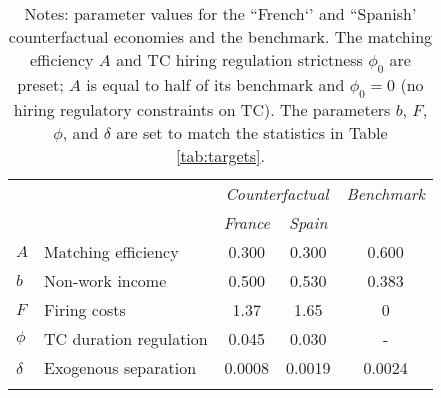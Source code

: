 \begin{table}[!h]
	\centering
	\label{tab:param:counterfactual}
	\begin{tabular}{l l c c c}
		\hline \hline
		  & & \multicolumn{2}{c}{\textit{Counterfactual}} & \textit{Benchmark} \\ 
		& & \textit{France} & \textit{Spain} \\ 
		\addlinespace
		\addlinespace
		$A$ & Matching efficiency    \hspace{80pt} & 0.300 & 0.300 & 0.600 \\ 
		$b$ & Non-work income & 0.500 & 0.530 & 0.383 \\ 
		$F$ & Firing costs & 1.37 & 1.65 & 0 \\ 
		$\phi$ & TC duration regulation & 0.045 & 0.030 & - \\ 
		$\delta$ & Exogenous separation & 0.0008 & 0.0019 & 0.0024 \\ 
		\addlinespace
		\hline \hline
	\end{tabular}
\caption*{\footnotesize Notes: parameter values for the ``French`' and ``Spanish' counterfactual economies and the benchmark. The matching efficiency $A$ and TC hiring regulation strictness $\phi_0$ are preset; $A$ is equal to half of its benchmark and $\phi_0=0$ (no hiring regulatory constraints on TC). The parameters $b$, $F$, $\phi$, and $\delta$ are set to match the statistics in Table \ref{tab:targets}.}\end{table}
